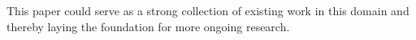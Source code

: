 This paper could serve as a strong collection of existing work in this domain and thereby laying the foundation for more ongoing research.



